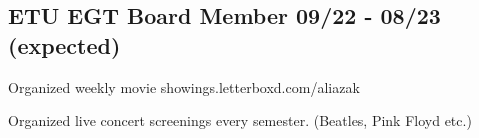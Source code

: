 \documentclass[a4paper,12pt]{article}
\begin{document}
\vspace*{10pt}
\subsection{{ETU EGT Board Member }\hfill 09/22 - 08/23 (expected)}
\begin{zitemize}
\item Organized weekly movie showings.\hfill letterboxd.com/aliazak
\item Organized live concert screenings every semester. (Beatles, Pink Floyd etc.)

\end{zitemize}
\end{document}
